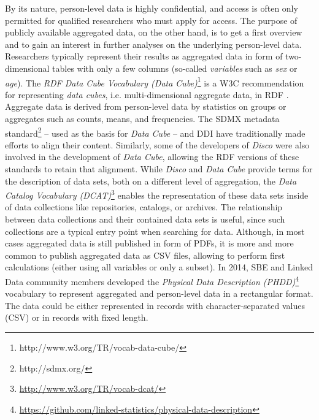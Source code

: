 \documentclass{llncs}
\begin{document}
By its nature, person-level data is highly confidential, and access is often only permitted for qualified researchers who must apply for access. 
The purpose of publicly available aggregated data, on the other hand, is to get a first overview and to gain an interest in further analyses on the underlying person-level data.
Researchers typically represent their results as aggregated data in form of two-dimensional tables with only a few columns (so-called \emph{variables} such as \emph{sex} or \emph{age}).
The \emph{RDF Data Cube Vocabulary (Data Cube)}\footnote{http://www.w3.org/TR/vocab-data-cube/} is a W3C recommendation for representing \emph{data cubes}, i.e. multi-dimensional aggregate data, in RDF \cite{Cyganiak2010}. 
Aggregate data is derived from person-level data by statistics on groups or aggregates such as counts, means, and frequencies.
The SDMX metadata standard\footnote{http://sdmx.org/} – used as the basis for \emph{Data Cube} – and DDI have traditionally made efforts to align their content. 
Similarly, some of the developers of \emph{Disco} were also involved in the development of \emph{Data Cube}, 
allowing the RDF versions of these standards to retain that alignment.
While \emph{Disco} and \emph{Data Cube} provide terms for the description of data sets, 
both on a different level of aggregation, 
the \emph{Data Catalog Vocabulary (DCAT)}\footnote{\url{http://www.w3.org/TR/vocab-dcat/}} enables the representation of these data sets inside of data collections like repositories, catalogs, or archives. 
The relationship between data collections and their contained data sets is useful, since such collections are a typical entry point when searching for data.
Although, in most cases aggregated data is still published in form of PDFs, 
it is more and more common to publish aggregated data as CSV files,
allowing to perform first calculations (either using all variables or only a subset).
In 2014, SBE and Linked Data community members developed the \emph{Physical Data Description (PHDD)}\footnote{\url{https://github.com/linked-statistics/physical-data-description}} vocabulary to represent aggregated and person-level data in a rectangular format. 
The data could be either represented in records with character-separated values (CSV) or in records with fixed length. 
\end{document}
